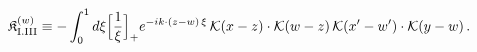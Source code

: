 \begin{align}\label{eq:K-w_rm_I_III}
&\mathfrak{K}^{(w)}_{\rm I.III}\equiv - \int_{0}^{1}d\xi\Big[\frac{1}{\xi}\Big]_{+}e^{-ik\cdot(z-w)\,\xi}\, \mathcal{K}(x-z)\cdot\mathcal{K}(w-z)\, \mathcal{K}(x'-w')\cdot\mathcal{K}(y-w)\,.
\end{align}
